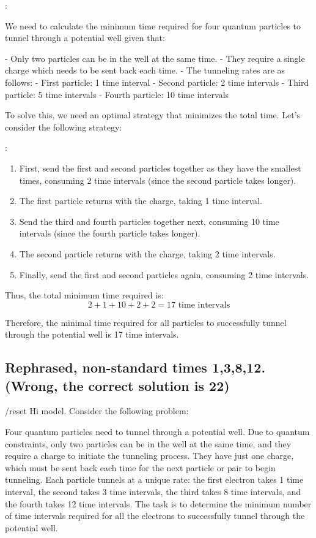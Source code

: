 \begin{airesult}
\problem:

We need to calculate the minimum time required for four quantum particles to
tunnel through a potential well given that:

- Only two particles can be in the well at the same time.
- They require a single charge which needs to be sent back each time.
- The tunneling rates are as follows:
  - First particle: 1 time interval
  - Second particle: 2 time intervals
  - Third particle: 5 time intervals
  - Fourth particle: 10 time intervals

To solve this, we need an optimal strategy that minimizes the total time. Let's
consider the following strategy:

\ans:

\begin{enumerate}
  \item First, send the first and second particles together as they have the
smallest times, consuming 2 time intervals (since the second particle takes
longer).
  \item The first particle returns with the charge, taking 1 time interval.
  \item Send the third and fourth particles together next, consuming 10 time
intervals (since the fourth particle takes longer).
  \item The second particle returns with the charge, taking 2 time intervals.
  \item Finally, send the first and second particles again, consuming 2 time
intervals.
\end{enumerate}

Thus, the total minimum time required is:
\[ 2 + 1 + 10 + 2 + 2 = 17 \text{ time intervals} \]

Therefore, the minimal time required for all particles to successfully tunnel
through the potential well is 17 time intervals.
\end{airesult}

\subsection{Rephrased, non-standard times 1,3,8,12. (Wrong, the correct solution is 22)}

\begin{ai}
/reset
Hi model. Consider the following problem:

Four quantum particles need to tunnel through a potential well. Due to quantum
constraints, only two particles can be in the well at the same time, and they
require a charge to initiate the tunneling process. They have just
one charge, which must be sent back each time for the next particle or pair
to begin tunneling. Each particle tunnels at a unique rate: the first electron
takes 1 time interval, the second takes 3 time intervals, the third takes 8 time
intervals, and the fourth takes 12 time intervals. The task is to determine the
minimum number of time intervals required for all the electrons to successfully
tunnel through the potential well.
\end{ai}


